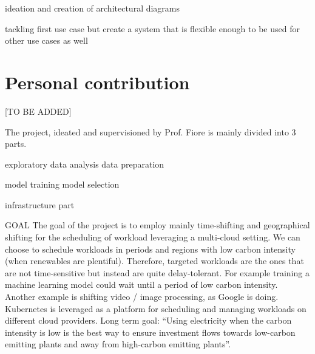 ideation and creation of architectural diagrams

tackling first use case
but create a system that is flexible enough to be used for other use cases as well

\section{Personal contribution}

[TO BE ADDED]

The project, ideated and supervisioned by Prof. Fiore is mainly divided into 3 parts.

exploratory data analysis
data preparation

model training
model selection

infrastructure part

GOAL
The goal of the project is to employ mainly time-shifting and geographical shifting for the scheduling of workload leveraging a multi-cloud setting.
We can choose to schedule workloads in periods and regions with low carbon intensity (when renewables are plentiful). 
Therefore, targeted workloads are the ones that are not time-sensitive but instead are quite delay-tolerant. For example training a machine learning model could wait until a period of low carbon intensity. Another example is shifting video / image processing, as Google is doing.
Kubernetes is leveraged as a platform for scheduling and managing workloads on different cloud providers.
Long term goal: “Using electricity when the carbon intensity is low is the best way to ensure investment flows towards low-carbon emitting plants and away from high-carbon emitting plants”.

\newpage
